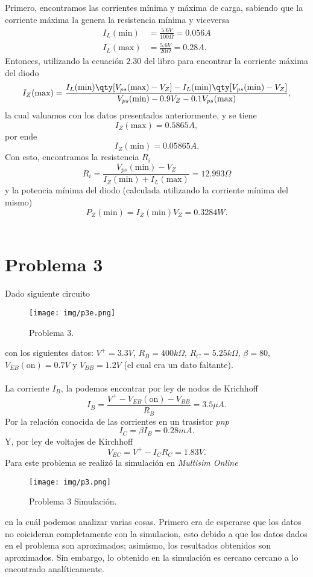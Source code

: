 \documentclass[conference]{IEEEtran}
\begin{document}
Primero, encontramos las corrientes mínima y máxima de carga, sabiendo que la corriente máxima la genera la resistencia mínima y viceversa
	\begin{align*}
		I_L (\text{min}) &= \frac{5.6V}{100\Omega} = 0.056A \\
		I_L (\text{max}) &= \frac{5.6V}{20\Omega} = 0.28A.
	\end{align*}
Entonces, utilizando la ecuación $2.30$ del libro \cite{b1} para encontrar la corriente máxima del diodo
	$$ I_Z (\text{max}) = \frac{I_L (\text{min}) \qty[V_{ps} (\text{max}) - V_Z] - I_L (\text{min}) \qty[V_{ps} (\text{min}) - V_Z]}{V_{ps} (\text{min}) - 0.9V_Z - 0.1V_{ps} (\text{max})}, $$
la cual valuamos con los datos presentados anteriormente, y se tiene
	$$ I_Z (\text{max}) = 0.5865A, $$
por ende
	$$ I_Z (\text{min}) = 0.05865A. $$
Con esto, encontramos la resistencia $R_i$
	$$ R_i = \frac{V_{ps} (\text{min}) - V_Z}{I_Z (\text{min}) + I_L (\text{max})} = \boxed{12.993\Omega} $$
y la potencia mínima del diodo (calculada utilizando la corriente mínima del mismo)
	$$ P_Z (\text{min}) = I_Z (\text{min}) V_Z = \boxed{0.3284W.} $$ \\

\section{Problema 3}
Dado siguiente circuito
\begin{figure}[H]
	\centering
	\texttt{[image: img/p3e.png]}
	\caption{Problema 3.}
	\label{p2e}
\end{figure}
con los siguientes datos: $V^+ = 3.3V$, $R_B = 400k\Omega$, $R_C = 5.25k\Omega$, $\beta = 80$, $V_{EB} (\text{on}) = 0.7V$ y $V_{BB} = 1.2V$ (el cual era un dato faltante). \\\\

La corriente $I_B$, la podemos encontrar por ley de nodos de Krichhoff
	$$ I_B = \frac{V^+ - V_{EB} (\text{on}) - V_{BB}}{R_B} = \boxed{3.5\mu A.} $$
Por la relación conocida de las corrientes en un trasistor \textit{pnp}
	$$ I_C = \beta I_B = \boxed{0.28mA.} $$
Y, por ley de voltajes de Kirchhoff
	$$ V_{EC} = V^+ - I_C R_C = \boxed{1.83V.} $$
Para este problema se realizó la simulación en \textit{Multisim Online}
\begin{figure}[H]
	\centering
	\texttt{[image: img/p3.png]}
	\caption{Problema 3 Simulación.}
	\label{p2e}
\end{figure}
en la cuál podemos analizar varias cosas. Primero era de esperarse que los datos no coicideran completamente con la simulacion, esto debido a que los datos dados en el problema son aproximados; asimismo, los resultados obtenidos son aproximados. Sin embargo, lo obtenido en la simulación es cercano cercano a lo encontrado analíticamente.\\
\end{document}
